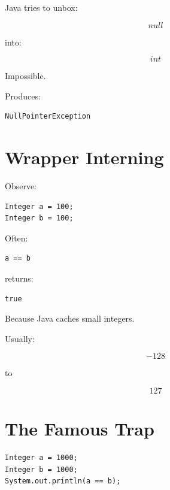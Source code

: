 \documentclass[11pt,a4paper]{book}
\begin{document}
Java tries to unbox:

\[
null
\]

into:

\[
int
\]

Impossible.


Produces:

\begin{verbatim}
NullPointerException
\end{verbatim}


\section{Wrapper Interning}

Observe:

\begin{verbatim}
Integer a = 100;
Integer b = 100;
\end{verbatim}


Often:

\begin{verbatim}
a == b
\end{verbatim}

returns:

\begin{verbatim}
true
\end{verbatim}


Because Java caches small integers.


Usually:

\[
-128
\]

to

\[
127
\]


\section{The Famous Trap}

\begin{verbatim}
Integer a = 1000;
Integer b = 1000;
System.out.println(a == b);
\end{verbatim}
\end{document}
